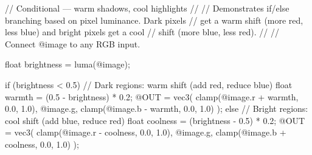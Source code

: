 // Conditional — warm shadows, cool highlights
//
// Demonstrates if/else branching based on pixel luminance. Dark pixels
// get a warm shift (more red, less blue) and bright pixels get a cool
// shift (more blue, less red).
//
// Connect @image to any RGB input.

float brightness = luma(@image);

if (brightness < 0.5) {
    // Dark regions: warm shift (add red, reduce blue)
    float warmth = (0.5 - brightness) * 0.2;
    @OUT = vec3(
        clamp(@image.r + warmth, 0.0, 1.0),
        @image.g,
        clamp(@image.b - warmth, 0.0, 1.0)
    );
} else {
    // Bright regions: cool shift (add blue, reduce red)
    float coolness = (brightness - 0.5) * 0.2;
    @OUT = vec3(
        clamp(@image.r - coolness, 0.0, 1.0),
        @image.g,
        clamp(@image.b + coolness, 0.0, 1.0)
    );
}